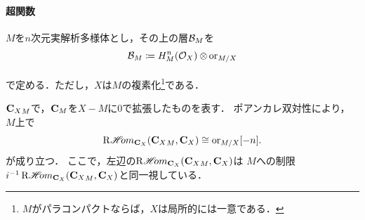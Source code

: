 \paragraph{超関数}

\(M\)を\(n\)次元実解析多様体とし，その上の層\(\cB_{M}\)を
\begin{equation}\label{eq:B-def1}
    \cB_{M}\coloneqq H^{n}_{M}(\cO_X)\ttens[]\ori_{M/X}    
\end{equation}
で定める．ただし，\(X\)は\(M\)の複素化\footnote{
    \(M\)がパラコンパクトならば，\(X\)は局所的には一意である．
}である．

\({\cc_{X}}_{M}\)で，\(\cc_{M}\)を\(X-M\)に0で拡張したものを表す．
ポアンカレ双対性により，\(M\)上で
\[
    \RHOM_{\cc_X}({\cc_{X}}_{M},\cc_{X})\cong\ori_{M/X}[-n].
\]
が成り立つ．
ここで，左辺の\(\RHOM_{\cc_X}({\cc_{X}}_{M},\cc_{X})\)は
\(M\)への制限\(
    i^{-1}\RHOM_{\cc_X}({\cc_{X}}_{M},\cc_{X})
\)と同一視している．

